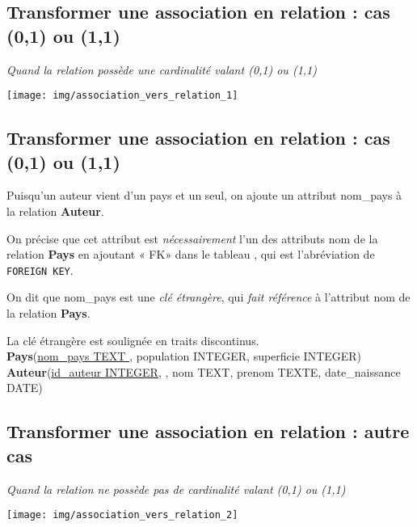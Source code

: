 \documentclass[10pt,firamath,cours]{nsi}
\begin{document}
\subsection{Transformer une association en relation : cas (0,1) ou (1,1)}
	\textit{Quand la relation possède une cardinalité valant (0,1) ou (1,1)}
	\begin{center}
		\texttt{[image: img/association\_vers\_relation\_1]}
	\end{center}




\subsection{Transformer une association en relation : cas (0,1) ou (1,1)}

	Puisqu'un auteur vient d'un pays et un seul, on ajoute un attribut nom\_pays à la relation \textbf{Auteur}.

	On précise que cet attribut est \textit{nécessairement} l'un des attributs nom de la relation \textbf{Pays} en ajoutant « FK»  dans le tableau , qui est l'abréviation de \texttt{FOREIGN KEY}.

	On dit que nom\_pays est une \textit{clé étrangère}, qui \textit{fait référence} à l'attribut nom de la relation \textbf{Pays}.

	La clé étrangère est soulignée en traits discontinus.\\


	
		\textbf{Pays}(\uline{nom\_pays TEXT }, population INTEGER, superficie INTEGER)\\

	\textbf{Auteur}(\uline{id\_auteur INTEGER},  , nom TEXT, prenom TEXTE, date\_naissance DATE)


\subsection{Transformer une association en relation : autre cas}
	\textit{Quand la relation ne possède pas de cardinalité valant (0,1) ou (1,1)}
	\begin{center}
		\texttt{[image: img/association\_vers\_relation\_2]}
	\end{center}
\end{document}
